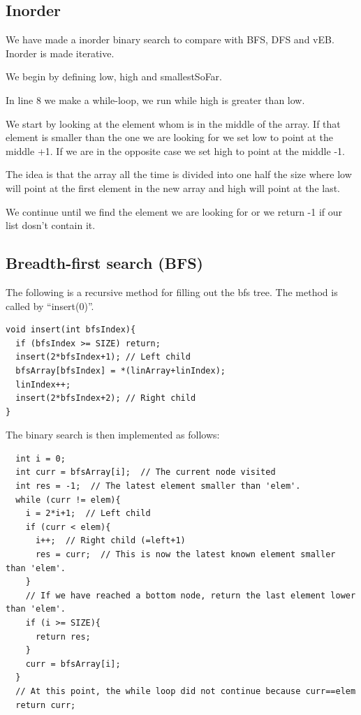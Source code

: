 \subsection{Inorder}

We have made a inorder binary search to compare with BFS, DFS and vEB.
Inorder is made iterative.

We begin by defining low, high and smallestSoFar.

In line 8 we make a while-loop, we run while high is greater than low.

We start by looking at the element whom is in the middle of the array.
If that element is smaller than the one we are looking for we set low to point at the middle +1.
If we are in the opposite case we set high to point at the middle -1.

The idea is that the array all the time is divided into one half the size where low will point at the first element in the new array and high will point at the last.

We continue until we find the element we are looking for or we return -1 if our list dosn't contain it.


\subsection{Breadth-first search (BFS)}


The following is a recursive method for filling out the bfs tree. The method is called by ``insert(0)''.
\begin{verbatim}
void insert(int bfsIndex){
  if (bfsIndex >= SIZE) return;
  insert(2*bfsIndex+1); // Left child
  bfsArray[bfsIndex] = *(linArray+linIndex);
  linIndex++;
  insert(2*bfsIndex+2); // Right child
}
\end{verbatim}


The binary search is then implemented as follows:
\begin{verbatim}
  int i = 0;
  int curr = bfsArray[i];  // The current node visited
  int res = -1;  // The latest element smaller than 'elem'.
  while (curr != elem){
    i = 2*i+1;  // Left child
    if (curr < elem){
      i++;  // Right child (=left+1)
      res = curr;  // This is now the latest known element smaller than 'elem'.
    }
    // If we have reached a bottom node, return the last element lower than 'elem'.
    if (i >= SIZE){
      return res;
    }
    curr = bfsArray[i];
  }
  // At this point, the while loop did not continue because curr==elem
  return curr;
\end{verbatim}




